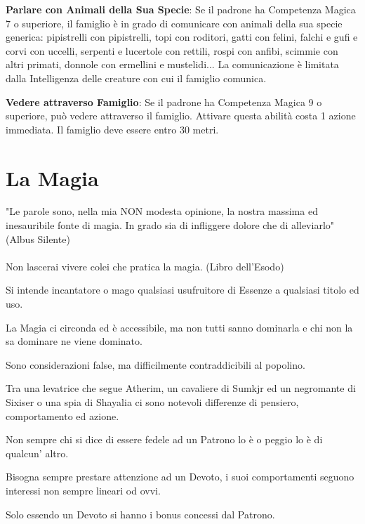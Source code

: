 \documentclass[a4paper,11pt,twoside,openany]{book}
\begin{document}
\textbf{Parlare con Animali della Sua Specie}: Se il padrone ha Competenza Magica 7 o superiore, il famiglio è in grado di comunicare con animali della sua specie generica: pipistrelli con pipistrelli, topi con roditori, gatti con felini, falchi e gufi e corvi con uccelli, serpenti e lucertole con rettili, rospi con anfibi, scimmie con altri primati, donnole con ermellini e mustelidi... La comunicazione è limitata dalla Intelligenza delle creature con cui il famiglio comunica.

\textbf{Vedere attraverso Famiglio}: Se il padrone ha Competenza Magica 9 o superiore, può vedere attraverso il famiglio. Attivare questa abilità costa 1 azione immediata. Il famiglio deve essere entro 30 metri.

\pagebreak

\section{La Magia}

\label{la-magia}
\begin{tcolorbox}[enhanced,arc=5pt,boxrule=0.3pt]{
"Le parole sono, nella mia NON modesta opinione, la nostra massima ed inesauribile fonte di magia. In grado sia di infliggere dolore che di alleviarlo" (Albus Silente)\\\\
Non lascerai vivere colei che pratica la magia. (Libro dell'Esodo)} \end{tcolorbox} \medskip

Si intende incantatore o mago qualsiasi usufruitore di Essenze a qualsiasi titolo ed uso.

La Magia ci circonda ed è accessibile, ma non tutti sanno dominarla e chi non la sa dominare ne viene dominato.

Sono considerazioni false, ma difficilmente contraddicibili al popolino.

Tra una levatrice che segue Atherim, un cavaliere di Sumkjr ed un negromante di Sixiser o una spia di Shayalia ci sono notevoli differenze di pensiero, comportamento ed azione.

Non sempre chi si dice di essere fedele ad un Patrono lo è o peggio lo è di qualcun' altro.

Bisogna sempre prestare attenzione ad un Devoto, i suoi comportamenti seguono interessi non sempre lineari od ovvi.

Solo essendo un Devoto si hanno i bonus concessi dal Patrono. 
\end{document}
